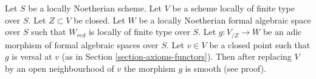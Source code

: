 %
\begin{lemma}
\label{lemma-openness-smoothness}
Let $S$ be a locally Noetherian scheme. Let $V$ be a scheme locally
of finite type over $S$. Let $Z \subset V$ be closed. Let $W$ be
a locally Noetherian formal algebraic space over $S$ such that
$W_{red}$ is locally of finite type over $S$. Let $g : V_{/Z} \to W$
be an adic morphism of formal algebraic spaces over $S$. Let $v \in V$
be a closed point such that $g$ is versal at $v$ (as in
Section \ref{section-axioms-functors}).
Then after replacing $V$ by an open neighbourhood of $v$ the
morphism $g$ is smooth (see proof).
\end{lemma}

